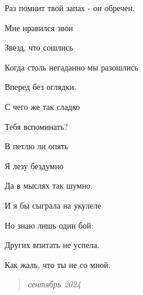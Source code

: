 \documentclass[
  a5paperpaper,
  DIV=11,
  numbers=noendperiod]{scrreprt}
\begin{document}
Раз помнит твой запах - он обречен.

Мне нравился звон

Звезд, что сошлись

Когда столь негаданно мы разошлись

Вперед без оглядки.

С чего же так сладко

Тебя вспоминать?

В петлю ли опять

Я лезу бездумно

Да в мыслях так шумно.

И я бы сыграла на укулеле

Но знаю лишь один бой:

Других впитать не успела.

Как жаль, что ты не со мной.

\begin{quote}
\emph{сентябрь 2024}
\end{quote}
\end{document}
